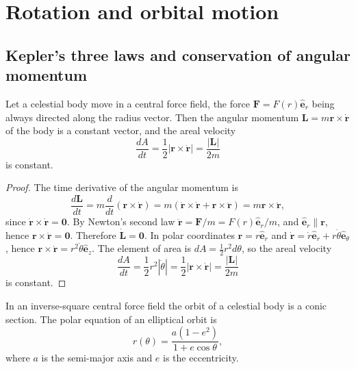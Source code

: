 \section{Rotation and orbital motion}
\label{sec:astro_rotation}

\subsection{Kepler's three laws and conservation of angular momentum}

\begin{lemma}\label{ch17_lemma_areal_velocity}
Let a celestial body move in a central force field, the force \(\mathbf F=F(r)\hat{\mathbf e}_r\) being always directed along the radius vector. Then the angular momentum \(\mathbf L=m\mathbf r\times\dot{\mathbf r}\) of the body is a constant vector, and the areal velocity
\[
\frac{dA}{dt}=\frac12|\mathbf r\times\dot{\mathbf r}|=\frac{|\mathbf L|}{2m}
\]
is constant.
\end{lemma}

\begin{proof}
The time derivative of the angular momentum is
\[
\frac{d\mathbf L}{dt}=m\frac{d}{dt}(\mathbf r\times\dot{\mathbf r})=m(\dot{\mathbf r}\times\dot{\mathbf r}+\mathbf r\times\ddot{\mathbf r})=m\mathbf r\times\ddot{\mathbf r},
\]
since \(\dot{\mathbf r}\times\dot{\mathbf r}=\mathbf 0\). By Newton's second law \(\ddot{\mathbf r}=\mathbf F/m=F(r)\hat{\mathbf e}_r/m\), and \(\hat{\mathbf e}_r\parallel\mathbf r\), hence \(\mathbf r\times\ddot{\mathbf r}=\mathbf 0\). Therefore \(\dot{\mathbf L}=\mathbf 0\).
In polar coordinates \(\mathbf r=r\hat{\mathbf e}_r\) and \(\dot{\mathbf r}=\dot r\hat{\mathbf e}_r+r\dot\theta\hat{\mathbf e}_\theta\), hence \(\mathbf r\times\dot{\mathbf r}=r^2\dot\theta\hat{\mathbf e}_z\). The element of area is \(dA=\frac12r^2d\theta\), so the areal velocity
\[
\frac{dA}{dt}=\frac12r^2|\dot\theta|=\frac12|\mathbf r\times\dot{\mathbf r}|=\frac{|\mathbf L|}{2m}
\]
is constant.
\end{proof}

\begin{theorem}\label{thm:kepler_first}
In an inverse-square central force field the orbit of a celestial body is a conic section. The polar equation of an elliptical orbit is
\[
r(\theta)=\frac{a(1-e^2)}{1+e\cos\theta},
\]
where \(a\) is the semi-major axis and \(e\) is the eccentricity.
\end{theorem}

